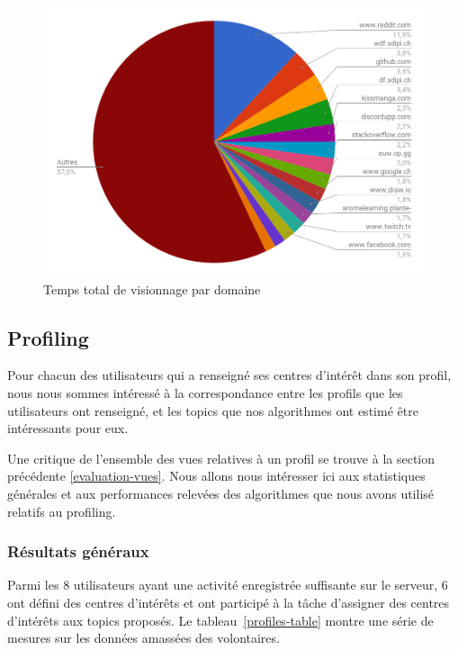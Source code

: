 	\begin{figure}[!h]
		\centering
		\includegraphics[height=0.75\textwidth]{images/results/temps_total_visionnage}
		\caption{Temps total de visionnage par domaine}
		\label{r-visionnage}
	\end{figure}


%
%
%
%
%
%

	\subsection{Profiling}

		Pour chacun des utilisateurs qui a renseigné ses centres d'intérêt dans son profil, nous nous sommes intéressé à la correspondance entre les profils que les utilisateurs ont renseigné, et les topics que nos algorithmes ont estimé être intéressants pour eux.

		Une critique de l'ensemble des vues relatives à un profil se trouve à la section précédente \ref{evaluation-vues}. Nous allons nous intéresser ici aux statistiques générales et aux performances relevées des algorithmes que nous avons utilisé relatifs au profiling.

		\subsubsection{Résultats généraux}

			Parmi les 8 utilisateurs ayant une activité enregistrée suffisante sur le serveur, 6 ont défini des centres d'intérêts et ont participé à la tâche d'assigner des centres d'intérêts aux topics proposés. Le tableau~\ref{profiles-table} montre une série de mesures sur les données amassées des volontaires.


